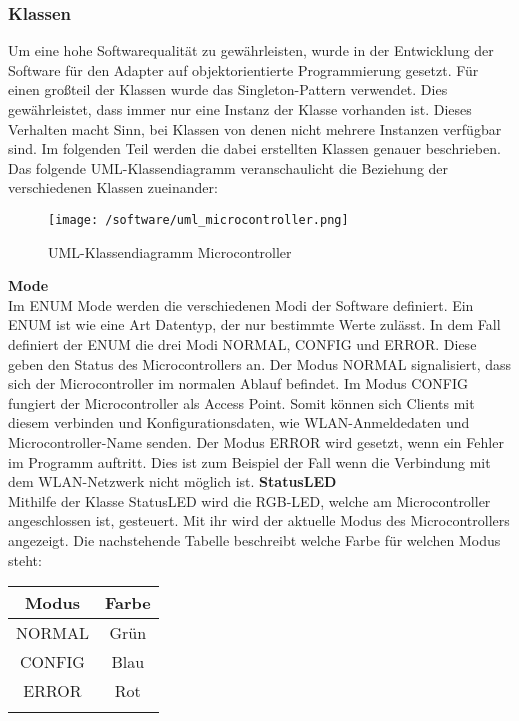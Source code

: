\documentclass[]{article}
\begin{document}
\subsubsection{Klassen}
Um eine hohe Softwarequalität zu gewährleisten, wurde in der Entwicklung der Software für den Adapter auf objektorientierte Programmierung gesetzt. Für einen großteil der Klassen wurde das Singleton-Pattern verwendet. Dies gewährleistet, dass immer nur eine Instanz der Klasse vorhanden ist. Dieses Verhalten macht Sinn, bei Klassen von denen nicht mehrere Instanzen verfügbar sind. Im folgenden Teil werden die dabei erstellten Klassen genauer beschrieben. Das folgende UML-Klassendiagramm veranschaulicht die Beziehung der verschiedenen Klassen zueinander:
\begin{figure}[H]
\texttt{[image: /software/uml\_microcontroller.png]}
\caption{UML-Klassendiagramm Microcontroller}
\end{figure}
\textbf{Mode} \\
Im ENUM Mode werden die verschiedenen Modi der Software definiert. Ein ENUM ist wie eine Art Datentyp, der nur bestimmte Werte zulässt. In dem Fall definiert der ENUM die drei Modi NORMAL, CONFIG und ERROR. Diese geben den Status des Microcontrollers an. Der Modus NORMAL signalisiert, dass sich der Microcontroller im normalen Ablauf befindet. Im Modus CONFIG fungiert der Microcontroller als Access Point. Somit können sich Clients mit diesem verbinden und Konfigurationsdaten, wie WLAN-Anmeldedaten und Microcontroller-Name senden. Der Modus ERROR wird gesetzt, wenn ein Fehler im Programm auftritt. Dies ist zum Beispiel der Fall wenn die Verbindung mit dem WLAN-Netzwerk nicht möglich ist.
\textbf{StatusLED} \\
Mithilfe der Klasse StatusLED wird die RGB-LED, welche am Microcontroller angeschlossen ist, gesteuert. Mit ihr wird der aktuelle Modus des Microcontrollers angezeigt. Die nachstehende Tabelle beschreibt welche Farbe für welchen Modus steht: \newline \\
\begin{tabularx}{\textwidth}{ |c|c| }
\hline
\textbf{Modus} & \textbf{Farbe} \\
\hline
NORMAL & Grün \\
\hline
CONFIG & Blau \\
\hline
ERROR & Rot \\
\hline
\newline \\
\end{tabularx}
\end{document}
